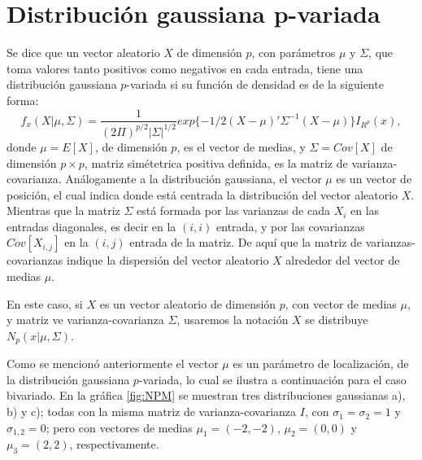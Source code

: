 \section{Distribución gaussiana p-variada}
Se dice que un vector aleatorio $X$ de dimensión $p$, con parámetros $\mu$ y $\Sigma$, que toma valores tanto positivos como negativos en cada entrada, tiene una distribución gaussiana $p$-variada  si su función de densidad es de la siguiente forma:
\begin{equation*}
	f_{x}(X|\mu,\Sigma)=\dfrac{1}{(2\Pi)^{p/2}|\Sigma|^{1/2}}exp\{-1/2(X-\mu)'\Sigma^{-1}(X-\mu)\}I_{R^{p}}(x),
\end{equation*}
donde $\mu=E[X]$, de dimensión $p$, es el vector de medias, y $\Sigma=Cov[X]$ de dimensión $p\times p$, matriz simétetrica positiva definida, es la matriz de varianza-covarianza. Análogamente a la distribución gaussiana, el vector $\mu$ es un vector de posición, el cual indica donde está centrada la distribución del vector aleatorio $X$. Mientras que la matriz $\Sigma$ está formada por las varianzas de cada $X_{i}$ en las entradas diagonales, es decir en la $(i,i)$ entrada, y por las covarianzas $Cov[X_{i,j}]$ en la $(i,j)$ entrada de la matriz. De aquí que la matriz de varianzas-covarianzas indique la dispersión del vector aleatorio $X$ alrededor del vector de medias $\mu$.

En este caso, si $X$ es un vector aleatorio de dimensión $p$, con vector de medias $\mu$, y matriz ve varianza-covarianza $\Sigma$, usaremos la notación $X$ se distribuye $N_{p}(x|\mu,\Sigma)$.

Como se mencionó anteriormente el vector $\mu$ es un parámetro de localización, de la distribución gaussiana $p$-variada, lo cual se ilustra a continuación para el caso bivariado. En la gráfica \ref{fig:NPM} se muestran  tres distribuciones gaussianas a), b) y c); todas con la misma matriz de varianza-covarianza $I$, con $\sigma_{1}=\sigma_{2}=1$ y $\sigma_{1,2}=0$; pero con vectores de medias $\mu_{1}=(-2,-2)$, $\mu_{2}=(0,0)$ y $\mu_{3}=(2,2)$, respectivamente. 

